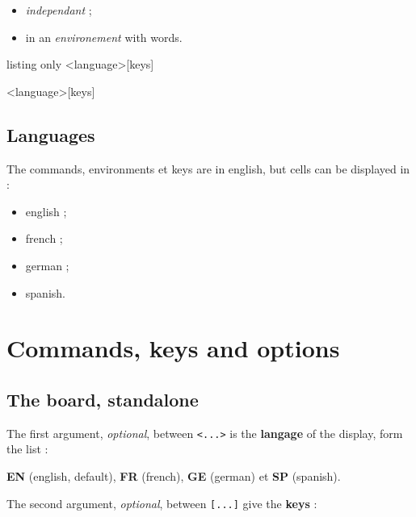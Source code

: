 \documentclass{article}
\newcommand\Cle[1]{{\bfseries\sffamily\textlangle #1\textrangle}}
\begin{document}
\begin{itemize}
	\item \textit{independant} ;
	\item in an \textit{environement} with words.
\end{itemize}

\begin{PresentationCode}{listing only}
\ScrabbleBoard<language>[keys]

\begin{EnvScrabble}<language>[keys]
\end{EnvScrabble}
\end{PresentationCode}

\subsection{Languages}

The \textsf{commands}, \textsf{environments} et \textsf{keys} are in english, but cells can be displayed in :

\begin{itemize}
	\item english ;
	\item french ;
	\item german ;
	\item spanish.
\end{itemize}

\pagebreak

\section{Commands, keys and options}

\subsection{The board, standalone}

The first argument, \textit{optional}, between \texttt{<...>} is the \Cle{langage} of the display, form the list :

\hfill\Cle{EN} (english, default), \Cle{FR} (french), \Cle{GE} (german) et \Cle{SP} (spanish).\hfill~

\smallskip

The second argument, \textit{optional}, between \texttt{[...]} give the \Cle{keys} :
\end{document}

